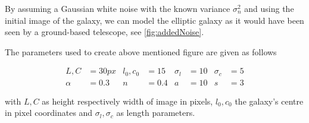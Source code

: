 By assuming a Gaussian white noise with the known variance $\sigma_n^2$ and using the initial image of the galaxy, we can model the elliptic galaxy as it would have been seen by a ground-based telescope, see \cref{fig:addedNoise}.



The parameters used to create above mentioned figure are given as follows


	\begin{align*}
		L, C & = 30px & l_0, c_0 & = 15 & \sigma_l & = 10 & \sigma_c & = 5 \\
		\alpha & = 0.3 & n & = 0.4 & a & = 10 & s & = 3 
	\end{align*}

with $L,C$ as height respectively width of image in pixels, $l_0, c_0$ the galaxy's centre in pixel coordinates and $\sigma_l, \sigma_c$ as length parameters.





